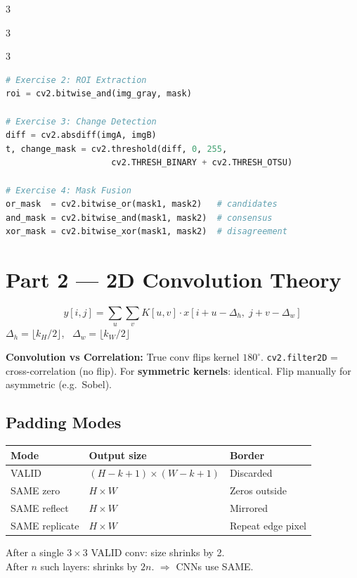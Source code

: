 \documentclass[9pt,landscape,a4paper]{extarticle}
\begin{document}
\begin{multicols*}{3}
\begin{multicols*}{3}
\begin{multicols}{3}
\begin{lstlisting}[language=Python]
# Exercise 2: ROI Extraction
roi = cv2.bitwise_and(img_gray, mask)

# Exercise 3: Change Detection
diff = cv2.absdiff(imgA, imgB)
t, change_mask = cv2.threshold(diff, 0, 255,
                     cv2.THRESH_BINARY + cv2.THRESH_OTSU)

# Exercise 4: Mask Fusion
or_mask  = cv2.bitwise_or(mask1, mask2)   # candidates
and_mask = cv2.bitwise_and(mask1, mask2)  # consensus
xor_mask = cv2.bitwise_xor(mask1, mask2)  # disagreement
\end{lstlisting}

\section{Part 2 — 2D Convolution Theory}

\[
  y[i,j] = \sum_{u}\sum_{v} K[u,v]\cdot x[i+u-\Delta_h,\; j+v-\Delta_w]
\]
$\Delta_h = \lfloor k_H / 2 \rfloor$, \ $\Delta_w = \lfloor k_W / 2 \rfloor$

\begin{infobox}
\textbf{Convolution vs Correlation:} True conv flips kernel $180^\circ$.
\texttt{cv2.filter2D} = cross-correlation (no flip).
For \textbf{symmetric kernels}: identical. Flip manually for asymmetric (e.g.\ Sobel).
\end{infobox}

\subsection{Padding Modes}

\begin{center}
\small
\begin{tabular}{@{}lll@{}}
\toprule
Mode & Output size & Border \\
\midrule
VALID & $(H-k+1)\times(W-k+1)$ & Discarded \\
SAME zero & $H\times W$ & Zeros outside \\
SAME reflect & $H\times W$ & Mirrored \\
SAME replicate & $H\times W$ & Repeat edge pixel \\
\bottomrule
\end{tabular}
\end{center}

After a single $3\times3$ VALID conv: size shrinks by 2. \\
After $n$ such layers: shrinks by $2n$. $\Rightarrow$ CNNs use SAME.


\end{multicols}
\end{multicols*}
\end{multicols*}
\end{document}
